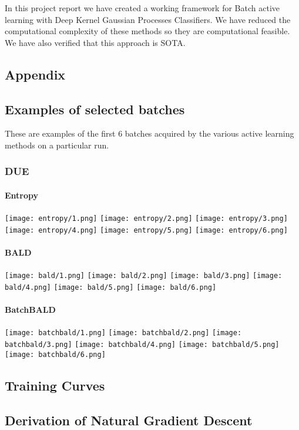 \documentclass[12pt, a4paper]{report}
\theoremstyle{definition}
\theoremstyle{definition}
\theoremstyle{definition}
\begin{document}
In this project report we have created a working framework for Batch active learning with Deep Kernel Gaussian Processes Classifiers. We have reduced the computational complexity of these methods so they are computational feasible. We have also verified that this approach is SOTA.





\renewcommand{\bibname}{Bibliography}



\begin{appendices}
\chapter{Appendix}

\section{Examples of selected batches}
\label{sec:Batches}

These are examples of the first 6 batches acquired by the various active learning methods on a particular run.

\subsection{DUE}

\subsubsection{Entropy}
\texttt{[image: entropy/1.png]}
\texttt{[image: entropy/2.png]}
\texttt{[image: entropy/3.png]}
\texttt{[image: entropy/4.png]}
\texttt{[image: entropy/5.png]}
\texttt{[image: entropy/6.png]}


\subsubsection{BALD}
\texttt{[image: bald/1.png]}
\texttt{[image: bald/2.png]}
\texttt{[image: bald/3.png]}
\texttt{[image: bald/4.png]}
\texttt{[image: bald/5.png]}
\texttt{[image: bald/6.png]}

\subsubsection{BatchBALD}
\texttt{[image: batchbald/1.png]}
\texttt{[image: batchbald/2.png]}
\texttt{[image: batchbald/3.png]}
\texttt{[image: batchbald/4.png]}
\texttt{[image: batchbald/5.png]}
\texttt{[image: batchbald/6.png]}

\section{Training Curves}

\section{Derivation of Natural Gradient Descent}

\end{appendices}
\end{document}
